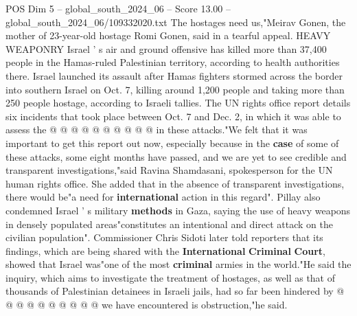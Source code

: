 \begin{textsample}{POS Dim 5 – global\_south\_2024\_06 – Score 13.00 – global\_south\_2024\_06/109332020.txt}
The hostages need us,"Meirav Gonen, the mother of 23-year-old hostage Romi Gonen, said in a tearful appeal.
HEAVY WEAPONRY Israel ' s air and ground offensive has killed more than 37,400 people in the Hamas-ruled Palestinian territory, according to health authorities there.
Israel launched its assault after Hamas fighters stormed across the border into southern Israel on Oct. 7, killing around 1,200 people and taking more than 250 people hostage, according to Israeli tallies.
The UN rights office report details six incidents that took place between Oct. 7 and Dec. 2, in which it was able to assess the @ @ @ @ @ @ @ @ @ @ in these attacks."We felt that it was important to get this report out now, especially because in the \textbf{case} of some of these attacks, some eight months have passed, and we are yet to see credible and transparent investigations,"said Ravina Shamdasani, spokesperson for the UN human rights office.
She added that in the absence of transparent investigations, there would be"a need for \textbf{international} action in this regard".
Pillay also condemned Israel ' s military \textbf{methods} in Gaza, saying the use of heavy weapons in densely populated areas"constitutes an intentional and direct attack on the civilian population".
Commissioner Chris Sidoti later told reporters that its findings, which are being shared with the \textbf{International} \textbf{Criminal} \textbf{Court}, showed that Israel was"one of the most \textbf{criminal} armies in the world."He said the inquiry, which aims to investigate the treatment of hostages, as well as that of thousands of Palestinian detainees in Israeli jails, had so far been hindered by @ @ @ @ @ @ @ @ @ @ we have encountered is obstruction,"he said.

\end{textsample}
